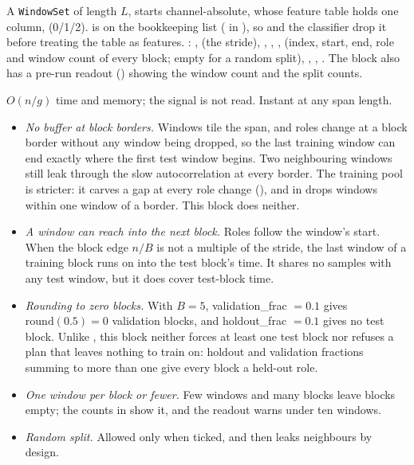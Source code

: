 A \texttt{WindowSet} of length $L$, starts channel-absolute, whose feature table holds one
column,  (0/1/2).  is on the bookkeeping list
( in ), so
 and the classifier drop it before treating the table as
features. : ,  (the stride), ,
, ,  (index, start, end, role and window
count of every block; empty for a random split), , ,
. The block also has a pre-run readout () showing the window count
and the split counts.

$O(n/g)$ time and memory; the signal is not read. Instant at any span length.

\begin{itemize}
\item \emph{No buffer at block borders.} Windows tile the span, and roles change at a block
  border without any window being dropped, so the last training window can end exactly
  where the first test window begins. Two neighbouring windows still leak through the slow
  autocorrelation at every border. The training pool is stricter: it carves a gap at every
  role change (), and  in
   drops windows within one window of a border. This
  block does neither.
\item \emph{A window can reach into the next block.} Roles follow the window's start. When
  the block edge $n/B$ is not a multiple of the stride, the last window of a training block
  runs on into the test block's time. It shares no samples with any test window, but it
  does cover test-block time.
\item \emph{Rounding to zero blocks.} With $B = 5$, validation\_frac $= 0.1$ gives
  $\mathrm{round}(0.5) = 0$ validation blocks, and holdout\_frac $= 0.1$ gives no test block.
  Unlike , this block neither forces at least
  one test block nor refuses a plan that leaves nothing to train on: holdout and validation
  fractions summing to more than one give every block a held-out role.
\item \emph{One window per block or fewer.} Few windows and many blocks leave blocks empty;
  the counts in  show it, and the readout warns under ten windows.
\item \emph{Random split.} Allowed only when ticked, and then leaks neighbours by design.
\end{itemize}


